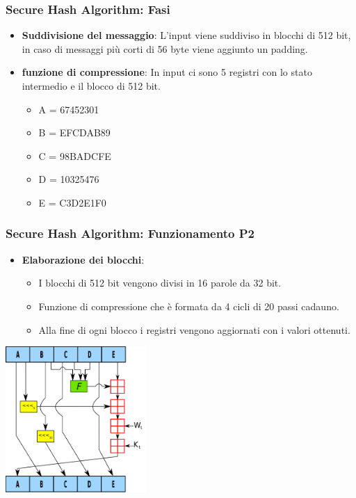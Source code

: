 \begin{frame}
\frametitle{Secure Hash Algorithm: Fasi}
\begin{itemize}
    \item \textbf{Suddivisione del messaggio}: L'input viene suddiviso in blocchi di 512 bit, in caso di messaggi 
    più corti di 56 byte viene aggiunto un padding. 
    \item \textbf{funzione di compressione}: In input ci sono 5 registri con lo stato intermedio e il blocco di 512 bit.
    \begin{itemize}
        \item A = 67452301
        \item B = EFCDAB89
        \item C = 98BADCFE
        \item D = 10325476
        \item E = C3D2E1F0
    \end{itemize}
\end{itemize}
\end{frame}


\begin{frame}
\frametitle{Secure Hash Algorithm: Funzionamento P2}
\begin{itemize}
    \item \textbf{Elaborazione dei blocchi}: 
    \begin{itemize}
        \item I blocchi di 512 bit vengono divisi in 16 parole da 32 bit.
        \item Funzione di compressione che è formata da 4 cicli di 20 passi cadauno.
        \item Alla fine di ogni blocco i registri vengono aggiornati con i valori ottenuti.
    \end{itemize}
\end{itemize}

\begin{center}
    \includegraphics[width=0.4\textwidth]{img/1-img/SHA-1.png}
\end{center}
\end{frame}

